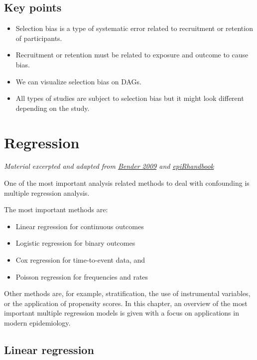 \documentclass[
]{book}
\providecommand{\tightlist}{%
  \setlength{\itemsep}{0pt}\setlength{\parskip}{0pt}}
\begin{document}
\hypertarget{key-points}{%
\section{Key points}\label{key-points}}

\begin{itemize}
\tightlist
\item
  Selection bias is a type of systematic error related to recruitment or retention of participants.
\item
  Recruitment or retention must be related to exposure and outcome to cause bias.
\item
  We can visualize selection bias on DAGs.
\item
  All types of studies are subject to selection bias but it might look different depending on the study.
\end{itemize}

\hypertarget{regression}{%
\chapter{Regression}\label{regression}}

\emph{Material excerpted and adapted from \href{https://www.hopkinsmedicine.org/gynecology_obstetrics/pdfs/medstudent/rtc2014/Epi\%20Study\%20Design\%20and\%20Exploratory\%20Analyses_abb.pdf}{Bender 2009} and \href{https://www.epirhandbook.com/en/}{epiRhandbook}}

One of the most important analysis related methods to deal with confounding is multiple regression analysis.

The most important methods are:

\begin{itemize}
\tightlist
\item
  Linear regression for continuous outcomes
\item
  Logistic regression for binary outcomes
\item
  Cox regression for time-to-event data, and
\item
  Poisson regression for frequencies and rates
\end{itemize}

Other methods are, for example, stratification, the use of instrumental variables, or the application of propensity scores. In this chapter, an overview of the most important multiple regression models is given with a focus on applications in modern epidemiology.

\hypertarget{linear-regression}{%
\section{Linear regression}\label{linear-regression}}
\end{document}
